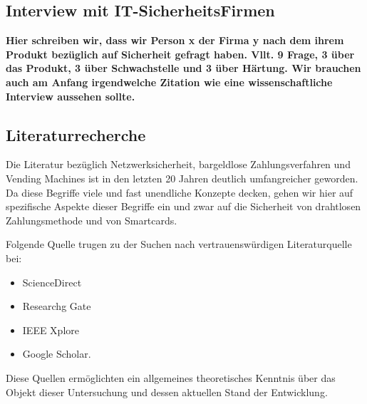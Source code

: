 \subsection{Interview mit IT-SicherheitsFirmen}

\textbf{Hier schreiben wir, dass wir Person x der Firma y nach dem ihrem Produkt bezüglich auf Sicherheit gefragt haben.
Vllt. 9 Frage, 3 über das Produkt, 3 über Schwachstelle und 3 über Härtung. Wir brauchen auch am Anfang irgendwelche Zitation
wie eine wissenschaftliche Interview aussehen sollte.}

\subsection{Literaturrecherche}

Die Literatur bezüglich Netzwerksicherheit, bargeldlose Zahlungsverfahren und Vending Machines ist in den 
letzten 20 Jahren deutlich umfangreicher geworden. Da diese Begriffe viele und fast unendliche Konzepte 
decken, gehen wir hier auf spezifische Aspekte dieser Begriffe ein und zwar auf die Sicherheit von drahtlosen 
Zahlungsmethode und von Smartcards. 

Folgende Quelle trugen zu der Suchen nach vertrauenswürdigen Literaturquelle bei:

\begin{itemize}
    \item ScienceDirect
    \item Researchg Gate
    \item IEEE Xplore
    \item Google Scholar.
\end{itemize}

Diese Quellen ermöglichten ein allgemeines theoretisches Kenntnis über das Objekt dieser Untersuchung und dessen aktuellen 
Stand der Entwicklung.

